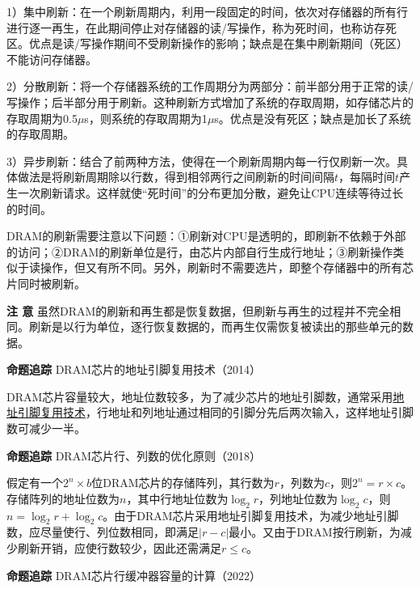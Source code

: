 \documentclass[UTF8]{ctexart}
\begin{document}
	1）集中刷新：在一个刷新周期内，利用一段固定的时间，依次对存储器的所有行进行逐一再生，在此期间停止对存储器的读/写操作，称为死时间，也称访存死区。优点是读/写操作期间不受刷新操作的影响；缺点是在集中刷新期间（死区）不能访问存储器。
	
	2）分散刷新：将一个存储器系统的工作周期分为两部分：前半部分用于正常的读/写操作；后半部分用于刷新。这种刷新方式增加了系统的存取周期，如存储芯片的存取周期为0.5$\mu$s，则系统的存取周期为1$\mu$s。优点是没有死区；缺点是加长了系统的存取周期。
	
	3）异步刷新：结合了前两种方法，使得在一个刷新周期内每一行仅刷新一次。具体做法是将刷新周期除以行数，得到相邻两行之间刷新的时间间隔$t$，每隔时间$t$产生一次刷新请求。这样就使“死时间”的分布更加分散，避免让CPU连续等待过长的时间。
	
	DRAM的刷新需要注意以下问题：①刷新对CPU是透明的，即刷新不依赖于外部的访问；②DRAM的刷新单位是行，由芯片内部自行生成行地址；③刷新操作类似于读操作，但又有所不同。另外，刷新时不需要选片，即整个存储器中的所有芯片同时被刷新。
	
	\begin{tcolorbox}[colframe=black, colback=white]
	\kaishu	\textbf{注 意} \quad 虽然DRAM的刷新和再生都是恢复数据，但刷新与再生的过程并不完全相同。刷新是以行为单位，逐行恢复数据的，而再生仅需恢复被读出的那些单元的数据。
	\end{tcolorbox}
	
	\begin{tcolorbox}[colframe=black, colback=white]
	\kaishu	\textbf{命题追踪} \quad DRAM芯片的地址引脚复用技术（2014）
	\end{tcolorbox}
	
	DRAM芯片容量较大，地址位数较多，为了减少芯片的地址引脚数，通常采用\underline{地址引脚复用技术}，行地址和列地址通过相同的引脚分先后两次输入，这样地址引脚数可减少一半。
	
	\begin{tcolorbox}[colframe=black, colback=white]
	\kaishu	\textbf{命题追踪} \quad DRAM芯片行、列数的优化原则（2018）
	\end{tcolorbox}
	
	假定有一个$2^n \times b$位DRAM芯片的存储阵列，其行数为$r$，列数为$c$，则$2^n = r \times c$。存储阵列的地址位数为$n$，其中行地址位数为$\log_2 r$，列地址位数为$\log_2 c$，则$n = \log_2 r + \log_2 c$。由于DRAM芯片采用地址引脚复用技术，为减少地址引脚数，应尽量使行、列位数相同，即满足$|r - c|$最小。又由于DRAM按行刷新，为减少刷新开销，应使行数较少，因此还需满足$r \leq c$。
	
	\begin{tcolorbox}[colframe=black, colback=white]
	\kaishu	\textbf{命题追踪} \quad DRAM芯片行缓冲器容量的计算（2022）
	\end{tcolorbox}
	
\end{document}
